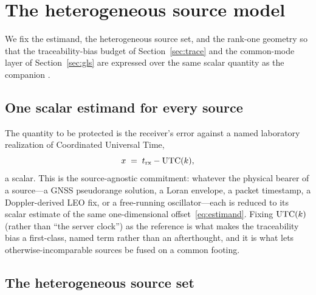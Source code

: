 \section{The heterogeneous source model}
\label{sec:hetero}

We fix the estimand, the heterogeneous source set, and the rank-one geometry so
that the traceability-bias budget of Section~\ref{sec:trace} and the common-mode
layer of Section~\ref{sec:gls} are expressed over the same scalar quantity as the
companion \citep{baweja2026cti}.

\subsection{One scalar estimand for every source}
\label{sec:estimand}

The quantity to be protected is the receiver's error against a named laboratory
realization of Coordinated Universal Time,
\begin{equation}
  x \;=\; t_{\mathrm{rx}} - \mathrm{UTC}(k){},
  \label{eq:estimand}
\end{equation}
a scalar. This is the source-agnostic commitment: whatever the physical bearer of a
source---a GNSS pseudorange solution, a Loran envelope, a packet timestamp, a
Doppler-derived LEO fix, or a free-running oscillator---each is reduced to its
scalar estimate of the same one-dimensional offset~\eqref{eq:estimand}. Fixing
$\mathrm{UTC}(k){}$ (rather than ``the server clock'') as the reference is what makes the
traceability bias a first-class, named term rather than an afterthought, and it is
what lets otherwise-incomparable sources be fused on a common footing.

\subsection{The heterogeneous source set}
\label{sec:sourceset}

